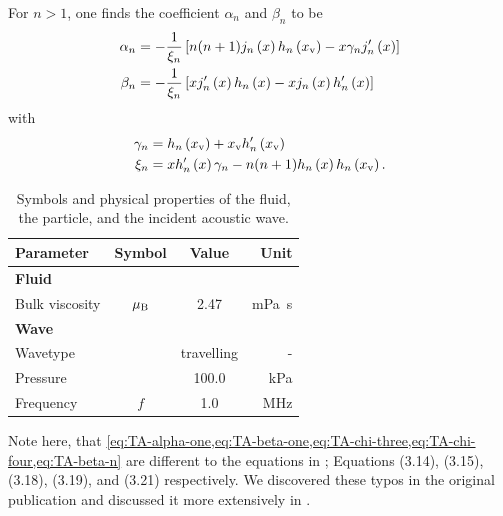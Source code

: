For $n > 1$, one finds the coefficient $\alpha_{n}$ and $\beta_{n}$ to be
\begin{subequations}
\begin{align}
  \alpha_{n} & =
  - \frac{1}{\xi_{n}} \left[
    n(n+1)j_{n}\left(x\right)h_{n}\left(x_{\mathrm{v}}\right) - x \gamma_{n}j^{\prime}_{n}\left(x\right)
  \right]
  \label{eq:TA-alpha-n}\\
    \beta_{n} &= - \frac{1}{\xi_{n}} \left[
      xj^{\prime}_{n}\left(x\right)h_{n}\left(x\right) - xj_{n}\left(x\right)h^{\prime}_{n}\left(x\right)
    \right]
    \label{eq:TA-beta-n}
\end{align}
\end{subequations}
with
\begin{subequations}
\begin{align}
  \gamma_{n} & =
  h_{n}\left(x_{\mathrm{v}}\right)+x_{\mathrm{v}}h^{\prime}_{n}\left(x_{\mathrm{v}}\right)
  \label{eq:TA-gamma-n}\\
  \xi_{n} &= xh^{\prime}_{n}\left(x\right)\gamma_{n} - n(n+1)h_{n}\left(x\right)h_{n}\left(x_{\mathrm{v}}\right).
    \label{eq:TA-xi-n}
\end{align}
\end{subequations}

\begin{table}
  \centering
  \begin{tabular}{lccr}
    \toprule
    \toprule
    {\bfseries Parameter} & {\bfseries Symbol} & {\bfseries Value} & {\bfseries 
    Unit}\\
    \midrule
    \textbf{Fluid} & & \\
    Bulk viscosity & $\mu_{\mathrm{B}}$ & 2.47 & \si{\milli\pascal\second} \\
    \midrule
    \textbf{Wave} & & \\
    Wavetype &  & travelling & - \\
    Pressure & & 100.0 & \si{\kilo\pascal} \\
    Frequency & $f$ & 1.0 & \si{\MHz} \\
    \bottomrule
    \bottomrule
  \end{tabular}
  \caption{Symbols and physical properties of the fluid, the particle, and the 
  incident acoustic wave.}\label{tab:TA-parameters}
\end{table}

Note here, that 
\cref{eq:TA-alpha-one,eq:TA-beta-one,eq:TA-chi-three,eq:TA-chi-four,eq:TA-beta-n} 
are different to the equations in ; Equations (3.14), 
(3.15), (3.18), (3.19), and (3.21) respectively. We discovered these typos in 
the original publication and discussed it more extensively in 
.

